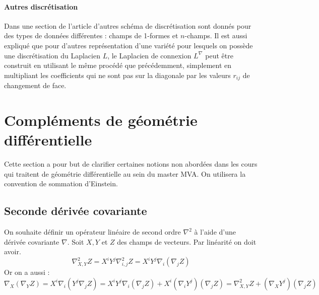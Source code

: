 \documentclass[11pt]{article}
\begin{document}
	\paragraph{Autres discrétisation}
	Dans une section de l'article d'autres schéma de discrétisation sont donnés pour des types de données différentes : champs de 1-formes et $n$-champs. Il est aussi expliqué que pour d'autres représentation d'une variété pour lesquels on possède une discrétisation du Laplacien $L$, le Laplacien de connexion $L^\nabla$ peut être construit en utilisant le même procédé que précédemment, simplement en multipliant les coefficients qui ne sont pas sur la diagonale par les valeurs $r_{ij}$ de changement de face.
	
	\appendix
	
	
	
	
	\section{Compléments de géométrie différentielle}
	
	Cette section a pour but de clarifier certaines notions non abordées dans les cours qui traitent de géométrie différentielle au sein du master MVA. On utilisera la convention de sommation d'Einstein.
	
	\subsection{Seconde dérivée covariante}
	
	On souhaite définir un opérateur linéaire de second ordre $\nabla^2$ à l'aide d'une dérivée covariante $\nabla$. Soit $X, Y$ et $Z$ des champs de vecteurs. Par linéarité on doit avoir.
	$$ \nabla_{X, Y}^2 Z = X^i Y^j \nabla_{i, j}^2 Z = X^i Y^j \nabla_i \left( \nabla_j Z \right) $$
	Or on a aussi :
	$$ \nabla_X \left( \nabla_Y Z \right) = X^i \nabla_i \left( Y^j \nabla_j Z \right) = X^i Y^j \nabla_i \left( \nabla_j Z \right) + X^i \left( \nabla_i Y^j \right) \left( \nabla_j Z \right) = \nabla_{X, Y}^2 Z + \left( \nabla_X Y^j \right) \left( \nabla_j Z \right) $$
\end{document}
